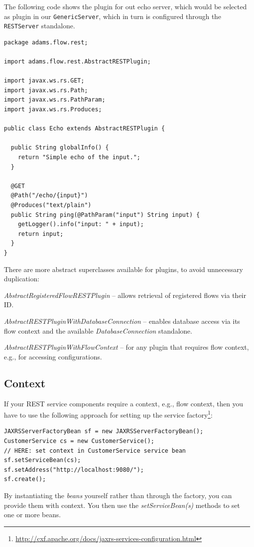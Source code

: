 \documentclass[a4paper]{book}
\begin{document}
The following code shows the plugin for out echo server, which would be selected
as plugin in our \verb|GenericServer|, which in turn is configured through the
\verb|RESTServer| standalone.

{\scriptsize
\begin{verbatim}
package adams.flow.rest;

import adams.flow.rest.AbstractRESTPlugin;

import javax.ws.rs.GET;
import javax.ws.rs.Path;
import javax.ws.rs.PathParam;
import javax.ws.rs.Produces;

public class Echo extends AbstractRESTPlugin {

  public String globalInfo() {
    return "Simple echo of the input.";
  }

  @GET
  @Path("/echo/{input}")
  @Produces("text/plain")
  public String ping(@PathParam("input") String input) {
    getLogger().info("input: " + input);
    return input;
  }
}
\end{verbatim}}

\noindent There are more abstract superclasses available for plugins, to
avoid unnecessary duplication:
\begin{tight_itemize}
  \item \textit{AbstractRegisteredFlowRESTPlugin} -- allows retrieval of
  registered flows via their ID.
  \item \textit{AbstractRESTPluginWithDatabaseConnection} -- enables database
  access via its flow context and the available \textit{DatabaseConnection}
  standalone.
  \item \textit{AbstractRESTPluginWithFlowContext} -- for any plugin that
  requires flow context, e.g., for accessing configurations.
\end{tight_itemize}

\subsection{Context}
If your REST service components require a context, e.g., flow context, then
you have to use the following approach for setting up the service
factory\footnote{\url{http://cxf.apache.org/docs/jaxrs-services-configuration.html}{}}:
\begin{verbatim}
JAXRSServerFactoryBean sf = new JAXRSServerFactoryBean();
CustomerService cs = new CustomerService();
// HERE: set context in CustomerService service bean
sf.setServiceBean(cs);
sf.setAddress("http://localhost:9080/");
sf.create();
\end{verbatim}
By instantiating the \textit{beans} yourself rather than through the factory,
you can provide them with context. You then use the \textit{setServiceBean(s)}
methods to set one or more beans.
\end{document}

